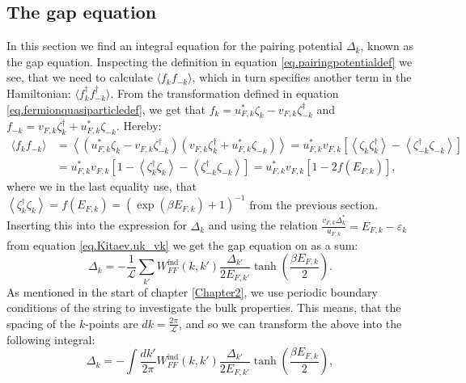 \subsection{The gap equation} \label{subsec.pairingpotential.integralequation}
In this section we find an integral equation for the pairing potential $\Delta_k$, known as the gap equation. Inspecting the definition in equation \eqref{eq.pairingpotentialdef} we see, that we need to calculate $\langle f_k f_{-k} \rangle$, which in turn specifies another term in the Hamiltonian: $\langle f^\dagger_k f^\dagger_{-k} \rangle$. From the transformation defined in equation \eqref{eq.fermionquasiparticledef}, we get that $f_k = u^*_{F,k}\zeta_k - v_{F,k}\zeta^\dagger_{-k}$ and $f_{-k} = v_{F,k}\zeta^\dagger_k + u^*_{F,k}\zeta_{-k}$. Hereby:
\begin{align}
\langle f_k f_{-k} \rangle &= \left \langle (u^*_{F,k}\zeta_k - v_{F,k}\zeta^\dagger_{-k}) (v_{F,k}\zeta^\dagger_k + u^*_{F,k}\zeta_{-k}) \right \rangle = u^*_{F,k}v_{F,k}\left[ \left \langle \zeta_k \zeta^\dagger_{k} \right \rangle - \left \langle \zeta^\dagger_{-k} \zeta_{-k} \right \rangle \right]  \nonumber \\
& =  u^*_{F,k}v_{F,k}\left[ 1 - \left \langle \zeta^\dagger_{k} \zeta_k \right \rangle - \left \langle \zeta^\dagger_{-k} \zeta_{-k} \right \rangle \right] = u^*_{F,k}v_{F,k}\left[1 - 2f(E_{F,k})\right], \nonumber
\end{align}
where we in the last equality use, that $\left \langle \zeta^\dagger_{k} \zeta_{k} \right \rangle = f(E_{F,k})=(\exp(\beta E_{F,k})+1)^{-1} $ from the previous section. Inserting this into the expression for $\Delta_k$ and using the relation $\frac{v_{F,k}\Delta^*_k}{u_{F,k}}=E_{F,k}-\varepsilon_k$ from equation \eqref{eq.Kitaev.uk_vk} we get the gap equation on as a sum:
\begin{equation}
\Delta_k = - \frac{1}{\mathcal{L}}\sum_{k'} W^\text{ind}_{FF}(k,k')\frac{\Delta_{k'}}{2E_{F,k'}}\tanh\left(\frac{\beta E_{F,k}}{2}\right).
\label{eq.GapequationSum}
\end{equation} 
As mentioned in the start of chapter \ref{Chapter2}, we use periodic boundary conditions of the string to investigate the bulk properties. This means, that the spacing of the $k$-points are $dk = \frac{2\pi}{\mathcal{L}}$, and so we can transform the above into the following integral:
\begin{equation}
\Delta_k = - \int \frac{dk'}{2\pi} W^\text{ind}_{FF}(k,k')\frac{\Delta_{k'}}{2E_{F,k'}}\tanh\left(\frac{\beta E_{F,k}}{2}\right),
\label{eq.GapequationIntegral}
\end{equation} 

